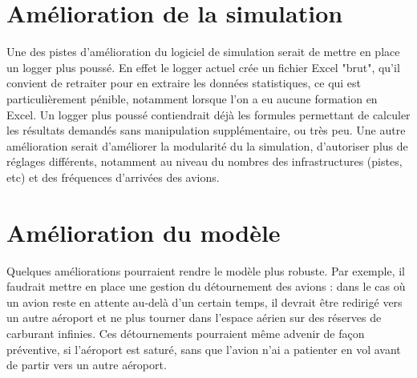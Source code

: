 
\section{Amélioration de la simulation}
Une des pistes d'amélioration du logiciel de simulation serait de mettre en place un logger plus poussé. En effet le logger actuel crée un fichier Excel "brut", qu'il convient de retraiter pour en extraire les données statistiques, ce qui est particulièrement pénible, notamment lorsque l'on a eu aucune formation en Excel. Un logger plus poussé contiendrait déjà les formules permettant de calculer les résultats demandés sans manipulation supplémentaire, ou très peu.
Une autre amélioration serait d'améliorer la modularité du la simulation, d'autoriser plus de réglages différents, notamment au niveau du nombres des infrastructures (pistes, etc) et des fréquences d'arrivées des avions.

\section{Amélioration du modèle}
Quelques améliorations pourraient rendre le modèle plus robuste. Par exemple, il faudrait mettre en place une gestion du détournement des avions : dans le cas où un avion reste en attente au-delà d'un certain temps, il devrait être redirigé vers un autre aéroport et ne plus tourner dans l'espace aérien sur des réserves de carburant infinies.
Ces détournements pourraient même advenir de façon préventive, si l'aéroport est saturé, sans que l'avion n'ai a patienter en vol avant de partir vers un autre aéroport.



